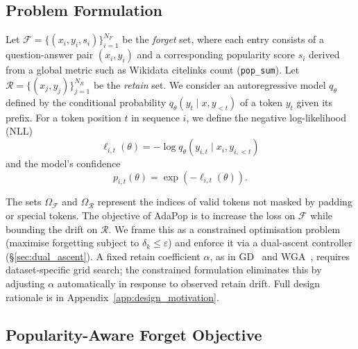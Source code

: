 \subsection{Problem Formulation}

Let $\mathcal{F}=\{(x_i,y_i,s_i)\}_{i=1}^{N_F}$ be the \emph{forget} set, where each entry consists of a question-answer pair $(x_i, y_i)$ and a corresponding popularity score $s_i$ derived from a global metric such as Wikidata citelinks count (\texttt{pop\_sum}). Let $\mathcal{R}=\{(x_j,y_j)\}_{j=1}^{N_R}$ be the \emph{retain} set. We consider an autoregressive model $q_\theta$ defined by the conditional probability $q_\theta(y_t \mid x, y_{<t})$ of a token $y_t$ given its prefix. For a token position $t$ in sequence $i$, we define the negative log-likelihood (NLL)
\begin{equation}
    \ell_{i,t}(\theta) = -\log q_\theta(y_{i,t} \mid x_i, y_{i,<t})
\end{equation}
and the model's confidence
\begin{equation}
    p_{i,t}(\theta) = \exp(-\ell_{i,t}(\theta)).
\end{equation}

The sets $\Omega_{\mathcal{F}}$ and $\Omega_{\mathcal{R}}$ represent the indices of valid tokens not masked by padding or special tokens. The objective of AdaPop is to increase the loss on $\mathcal{F}$ while bounding the drift on $\mathcal{R}$. We frame this as a constrained optimisation problem (maximise forgetting subject to $\delta_k \le \varepsilon$) and enforce it via a dual-ascent controller (§\ref{sec:dual_ascent}). A fixed retain coefficient $\alpha$, as in GD~\cite{liu2022continual} and WGA~\cite{wang2025rethinking}, requires dataset-specific grid search; the constrained formulation eliminates this by adjusting $\alpha$ automatically in response to observed retain drift. Full design rationale is in Appendix~\ref{app:design_motivation}.



\subsection{Popularity-Aware Forget Objective}

